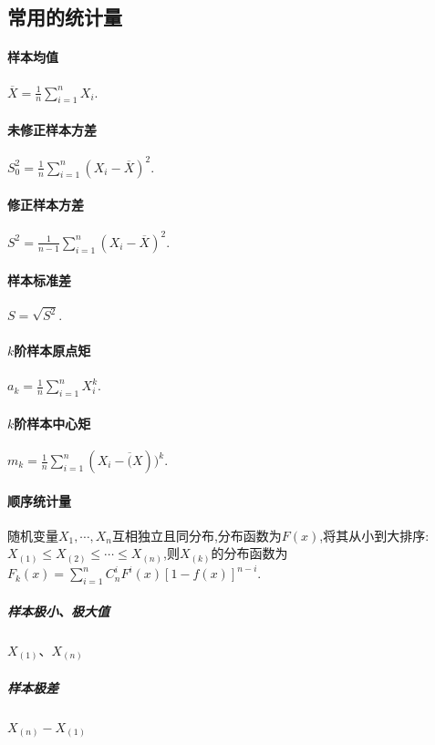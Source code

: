 \documentclass[UTF8]{ctexart}
\begin{document}
\subsection{常用的统计量}
\begin{multicols}{2}
\paragraph{样本均值}$\overline{X}=\frac{1}{n}\sum_{i=1}^nX_i$.
\paragraph{未修正样本方差}$S_0^2=\frac{1}{n}\sum_{i=1}^n(X_i-\overline{X})^2.$
\paragraph{修正样本方差}$S^2=\frac{1}{n-1}\sum_{i=1}^n(X_i-\overline{X})^2.$
\paragraph{样本标准差}$S=\sqrt{S^2}$.
\paragraph{$k$阶样本原点矩}$a_k=\frac{1}{n}\sum_{i=1}^nX_i^k$.
\paragraph{$k$阶样本中心矩}$m_k=\frac{1}{n}\sum_{i=1}^n(X_i-\overline(X))^k$.
\end{multicols}
\paragraph{顺序统计量}随机变量$X_1,\cdots,X_n$互相独立且同分布,分布函数为$F(x)$,将其从小到大排序:$X_{(1)}\leq X_{(2)}\leq\cdots\leq X_{(n)}$,则$X_{(k)}$的分布函数为$F_k(x)=\sum_{i=1}^nC_n^iF^i(x)[1-f(x)]^{n-i}.$
\subparagraph{样本极小、极大值}$X_{(1)}$、$X_{(n)}$
\subparagraph{样本极差}$X_{(n)}-X_{(1)}$  
\end{document}
